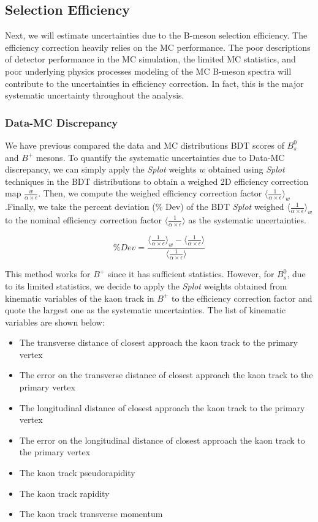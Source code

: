 \subsection{Selection Efficiency}

Next, we will estimate uncertainties due to the B-meson selection efficiency. The efficiency correction heavily relies on the MC performance. The poor descriptions of detector performance in the MC simulation, the limited MC statistics, and poor underlying physics processes modeling of the MC B-meson spectra will contribute to the uncertainties in efficiency correction. In fact, this is the major systematic uncertainty throughout the analysis.

\subsubsection{Data-MC Discrepancy}

We have previous compared the data and MC distributions BDT scores of $B^0_s$ and $B^+$ mesons. To quantify the systematic uncertainties due to Data-MC discrepancy, we can simply apply the \textit{Splot} weights $w$ obtained using \textit{Splot} techniques in the BDT distributions to obtain a weighed 2D efficiency correction map $\frac{w}{\alpha \times \epsilon}$. Then, we compute the weighed efficiency correction factor $\langle \frac{1}{\alpha \times \epsilon}\rangle_{w}$.Finally, we take the percent deviation (\% Dev) of the BDT \textit{Splot} weighed $\langle \frac{1}{\alpha \times \epsilon}\rangle_{w}$ to the nominal efficiency correction factor $\langle \frac{1}{\alpha \times \epsilon}\rangle$ as the systematic uncertainties. 

\begin{equation}
\% Dev = \frac{\langle \frac{1}{\alpha \times \epsilon} \rangle_{w} - \langle \frac{1}{\alpha \times \epsilon} \rangle}{\langle \frac{1}{\alpha \times \epsilon} \rangle}
\end{equation}

This method works for $B^+$ since it has sufficient statistics.  However, for $B^0_s$, due to its limited statistics, we decide to apply the \textit{Splot} weights obtained from kinematic variables of the kaon track in $B^+$ to the efficiency correction factor and quote the largest one as the systematic uncertainties. The list of kinematic variables are shown below: 


\begin{itemize}
\item The transverse distance of closest approach the kaon track to the primary vertex
\item The error on the transverse distance of closest approach the kaon track to the primary vertex
\item The longitudinal distance of closest approach the kaon track to the primary vertex
\item The error on the longitudinal distance of closest approach the kaon track to the primary vertex
\item The kaon track pseudorapidity 
\item The kaon track rapidity 
\item The kaon track transverse momentum 
\end{itemize}


